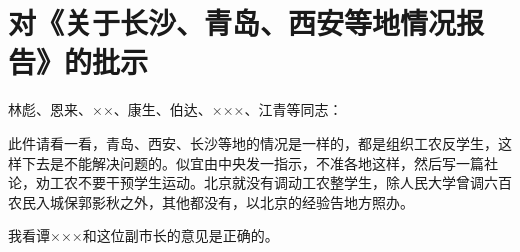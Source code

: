 \section[对《关于长沙、青岛、西安等地情况报告》的批示（一九六六年九月七日）]{对《关于长沙、青岛、西安等地情况报告》的批示}


林彪、恩来、××、康生、伯达、×××、江青等同志：

此件请看一看，青岛、西安、长沙等地的情况是一样的，都是组织工农反学生，这样下去是不能解决问题的。似宜由中央发一指示，不准各地这样，然后写一篇社论，劝工农不要干预学生运动。北京就没有调动工农整学生，除人民大学曾调六百农民入城保郭影秋之外，其他都没有，以北京的经验告地方照办。

我看谭×××和这位副市长的意见是正确的。



